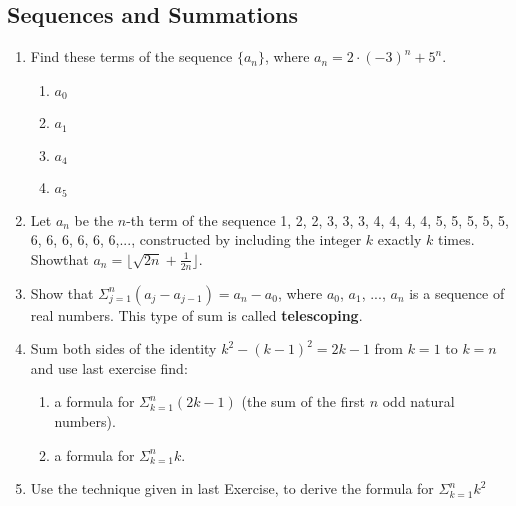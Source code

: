 \documentclass{../../cls/sig-alternate-05-2015}
\begin{document}
\subsection{Sequences and Summations}
\begin{enumerate}
\item Find these terms of the sequence $\{a_n\}$, where $a_n = 2 \cdot (−3)^n + 5^n$.\begin{enumerate}
	\item $a_0$
	\item $a_1$
	\item $a_4$
	\item $a_5$
\end{enumerate}

\item Let $a_n$ be the $n$-th term of the sequence 1, 2, 2, 3, 3, 3, 4, 4, 4, 4, 5, 5, 5, 5, 5, 6, 6, 6, 6, 6, 6,..., constructed by including the integer $k$ exactly $k$ times. Showthat $a_n = \lfloor \sqrt{2n}+ \frac{1}{2n} \rfloor$.

\item Show that $\Sigma^n_{j = 1}(a_j - a_{j - 1}) = a_n - a_0$, where
$a_0$, $a_1$, ..., $a_n$ is a sequence of real numbers. This type of sum is called \textbf{telescoping}.

\item Sum both sides of the identity $k^2 - (k - 1)^2 = 2k - 1$ from $k = 1$ to $k = n$ and use last exercise find:
\begin{enumerate}
	\item a formula for $\Sigma^n_{k = 1}(2k - 1)$ (the sum of the first $n$ odd natural numbers).
	\item a formula for $\Sigma^n_{k = 1} k$.
\end{enumerate}

\item Use the technique given in last Exercise, to derive the formula for $\Sigma^n_{k = 1} k^2$

\end{enumerate}
\end{document}
